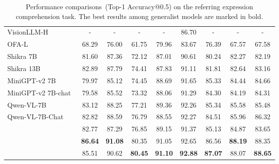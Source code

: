 \documentclass{article} \usepackage{iclr2024_conference,times}
\newcommand{\sphinx}{\textcolor{Goldenrod3}{\textbf{\textit{SPHINX}}}~}
\newcommand{\sphinxonek}{\textcolor{Goldenrod3}{\textbf{\textit{SPHINX-1k}}}~}
\newcommand{\sphinxtwok}{\textcolor{Goldenrod3}{\textbf{\textit{SPHINX-2k}}}~}
\begin{document}
\begin{table}[]
{\begin{tabular}{lcccccccc}
\multicolumn{1}{l|}{VisionLLM-H~\citep{wang2023visionllm}} & - & - & - & - & 86.70 & - & - & - \\
\multicolumn{1}{l|}{OFA-L~\citep{wang2022ofa}} & 68.29 & 76.00 & 61.75 & 79.96 & 83.67 & 76.39 & 67.57 & 67.58 \\
\multicolumn{1}{l|}{Shikra 7B~\citep{chen2023shikra}} & 81.60 & 87.36 & 72.12 & 87.01 & 90.61 & 80.24 & 82.27 & 82.19 \\
\multicolumn{1}{l|}{Shikra 13B~\citep{chen2023shikra}} & 82.89 & 87.79 & 74.41 & 87.83 & 91.11 & 81.81 & 82.64 & 83.16\\
\multicolumn{1}{l|}{MiniGPT-v2 7B~\citep{chen2023minigpt}} & 79.97 & 85.12 & 74.45 & 88.69 & 91.65 & 85.33 & 84.44 & 84.66 \\
\multicolumn{1}{l|}{MiniGPT-v2 7B-chat~\citep{chen2023minigpt}} & 79.58 & 85.52 & 73.32 & 88.06 & 91.29 & 84.30 & 84.19 & 84.31 \\
\multicolumn{1}{l|}{Qwen-VL-7B~\citep{Bai2023QwenVLAF}} & 83.12 & 88.25 & 77.21 & 89.36 & 92.26 & 85.34 & 85.58 & 85.48 \\
\multicolumn{1}{l|}{Qwen-VL-7B-Chat~\citep{Bai2023QwenVLAF}} & 82.82 & 88.59 & 76.79 & 88.55 & 92.27 & 84.51 & 85.96 & 86.32 \\
\cmidrule(lr){1-1}\cmidrule(lr){2-4}\cmidrule(lr){5-7}\cmidrule(lr){8-9}
\rowcolor[gray]{0.95}
\multicolumn{1}{l|}{\cellcolor[gray]{0.95}\sphinx} & 82.77 & 87.29 & 76.85 & 89.15 & 91.37 & 85.13 & 84.87 & 83.65 \\
\rowcolor[gray]{0.95}
\multicolumn{1}{l|}{\cellcolor[gray]{0.95}\sphinxonek} & \textbf{86.64} & \textbf{91.08} & 80.35 & 91.05 & 92.65 & 86.56 & \textbf{88.19} & 88.35 \\ 
\rowcolor[gray]{0.95}\multicolumn{1}{l|}{\cellcolor[gray]{0.95}\sphinxtwok} & 85.51 & 90.62 & \textbf{80.45} & \textbf{91.10} & \textbf{92.88} & \textbf{87.07} & 88.07 & \textbf{88.65} \\
\bottomrule
\end{tabular}
} \caption{Performance comparisons~(Top-1 Accuracy@0.5) on the referring expression comprehension task. The best results among generalist models are marked in bold.}
\label{table:ref}
\end{table}
\end{document}
